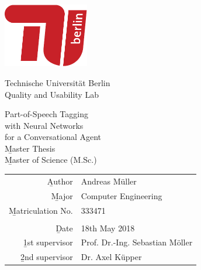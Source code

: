 
\pagestyle{empty}

\clearscrheadings\clearscrplain
\begin{center}
\includegraphics[width=0.28\textwidth]{images/logo_tu_berlin}
\vspace{8mm}

{\huge Technische Universität Berlin}\\
\vspace{2mm}
{\large Quality and Usability Lab}\\
\vspace{11mm}

{\Huge Part-of-Speech Tagging\\[-2mm] with Neural Networks\\[-2mm] for a Conversational Agent\\}
\vspace{20mm}
{\Huge \b{Master Thesis}}\\
{\b{Master of Science (M.Sc.)}}\\
\vspace{24mm}
\begin{tabular}{rl}
  \b{Author} & Andreas Müller\\
  \b{Major} & Computer Engineering\\
  \b{Matriculation No.} & 333471\\
   & \\
  \b{Date} & 18th May 2018 \\
  \b{1st supervisor} & Prof. Dr.-Ing. Sebastian Möller \\
  \b{2nd supervisor} & Dr. Axel Küpper \\
\end{tabular}

\end{center}
\clearpage
\pagestyle{scrheadings} %

